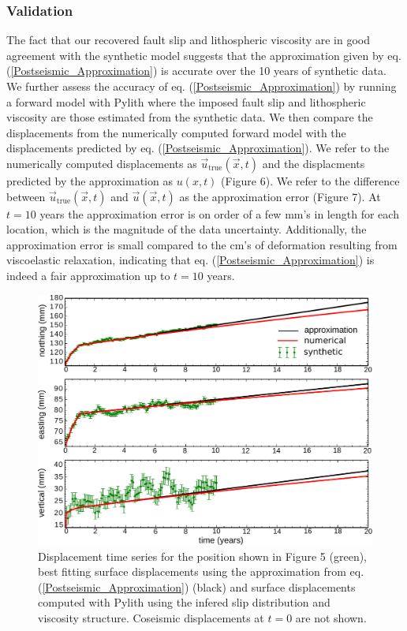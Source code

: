 \documentclass[extra]{gji}
\begin{document}
\subsubsection{Validation}
The fact that our recovered fault slip and lithospheric viscosity are
in good agreement with the synthetic model suggests that the
approximation given by eq. (\ref{Postseismic_Approximation}) is
accurate over the 10 years of synthetic data.  We further assess the accuracy
of eq. (\ref{Postseismic_Approximation}) by running a forward model
with Pylith where the imposed fault slip and lithospheric viscosity
are those estimated from the synthetic data.  We then compare the
displacements from the numerically computed forward model with the
displacements predicted by eq. (\ref{Postseismic_Approximation}).  We
refer to the numerically computed displacements as
$\vec{u}_{\mathrm{true}}(\vec{x},t)$ and the displacments predicted by the
approximation as $u(x,t)$ (Figure 6).  We refer to the
difference between $\vec{u}_{\mathrm{true}}(\vec{x},t)$ and $\vec{u}(\vec{x},t)$
as the approximation error (Figure 7). At $t=10$ years the
approximation error is on order of a few mm's in length for each
location, which is the magnitude of the data uncertainty.
Additionally, the approximation error is small compared to the
cm's of deformation resulting from viscoelastic relaxation, indicating
that eq. (\ref{Postseismic_Approximation}) is indeed a fair
approximation up to $t=10$ years.  

\begin{figure}\label{figure6}
  \centering
  \includegraphics[scale=0.6]{FinalFigures/Figure5.pdf}
  \caption{Displacement time series for the position shown in Figure 5
    (green), best fitting surface displacements using the
    approximation from eq. (\ref{Postseismic_Approximation}) (black)
    and surface displacements computed with Pylith using the infered
    slip distribution and viscosity structure. Coseismic displacements
    at $t=0$ are not shown.}
  \label{Figure 6}
\end{figure}
\end{document}
